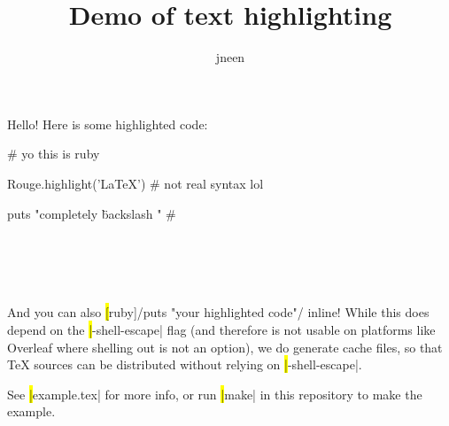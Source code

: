 \documentclass{article}
\begin{document}
\def\withcursor#1{\texttt{\textbf{%
  \fboxsep=0pt\colorbox{gray}{%
    \parbox[c][\height][c]{0.61em}{%
      \strut\textcolor{white}{#1}%
    }%
  }}%
}}
\def\cursormark{\withcursor{}}
\def\prompt{\textasciitilde>}

\title{Demo of text highlighting}
\author{jneen}

\maketitle

\noindent Hello! Here is some highlighted code:

\begin{hilite}[ruby]
# yo this is ruby

Rouge.highlight('LaTeX') # not real syntax lol

puts "completely \" backslash \safe" # \\\\\\\\\
\end{hilite}

\noindent And you can also \hl[ruby]/puts "your highlighted code"/ inline! While this does depend on the \hl|-shell-escape| flag (and therefore is not usable on platforms like Overleaf where shelling out is not an option), we do generate cache files, so that TeX sources can be distributed without relying on \hl|-shell-escape|.

See \hl|example.tex| for more info, or run \hl|make| in this repository to make the example.
\end{document}
